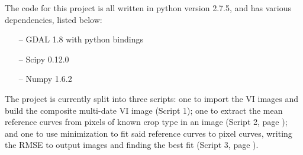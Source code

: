 \newpage
{}

The code for this project is all written in python version 2.7.5, and has various dependencies, listed below:

\begin{spacing}{1}
\begin{itemize}
  \item[--] GDAL 1.8 with python bindings
  \item[--] Scipy 0.12.0
  \item[--] Numpy 1.6.2
\end{itemize}
\end{spacing}

The project is currently split into three scripts: one to import the VI images and build the composite multi-date VI image (Script 1); one to extract the mean reference curves from pixels of known crop type in an image (Script 2, page \pageref{script2}); and one to use minimization to fit said reference curves to pixel curves, writing the RMSE to output images and finding the best fit (Script 3, page \pageref{script3}).



